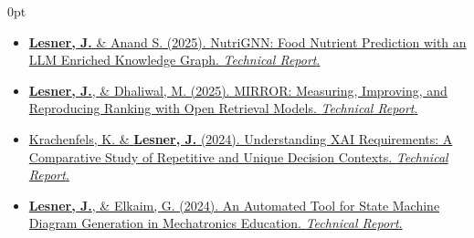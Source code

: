 \documentclass[11pt]{article}
\newlength{\sectionwidth}
\newcommand{\CVSection}[2]{%
  \vspace{1.4em} 
  \noindent
  \makebox[0pt][l]{%
    \parbox[t]{\sectionwidth}{%
      \raggedright\scshape\bfseries\small #1%
    }%
  }%
  \begin{adjustwidth}{\sectionwidth}{0pt}
    #2
  \end{adjustwidth}
}
\begin{document}
\CVSection{Reports}{%
  \begin{itemize}
  
      \item \href{https://jlesner0.ackop.com/nutrignn_0032.pdf}{\textbf{Lesner, J.} \& Anand S. (2025). NutriGNN: Food Nutrient Prediction with an LLM Enriched Knowledge Graph. \textit{Technical Report}.}

      \item \href{https://jlesner0.ackop.com/mirror_0031.pdf}{\textbf{Lesner, J.}, \& Dhaliwal, M. (2025). MIRROR: Measuring, Improving, and Reproducing Ranking with Open Retrieval Models. \textit{Technical Report}.}

      \item \href{https://jlesner0.ackop.com/guardlens_0030.pdf}{Krachenfels, K. \& \textbf{Lesner, J.} (2024). Understanding XAI Requirements:
A Comparative Study of Repetitive and Unique Decision Contexts. \textit{Technical Report}.}
      
      \item \href{https://jlesner0.ackop.com/smv_icra_0020.pdf}{\textbf{Lesner, J.}, \& Elkaim, G. (2024). An Automated Tool for State Machine Diagram Generation in Mechatronics Education. \textit{Technical Report}.}
      
  \end{itemize}
}




      
    
    
\end{document}

